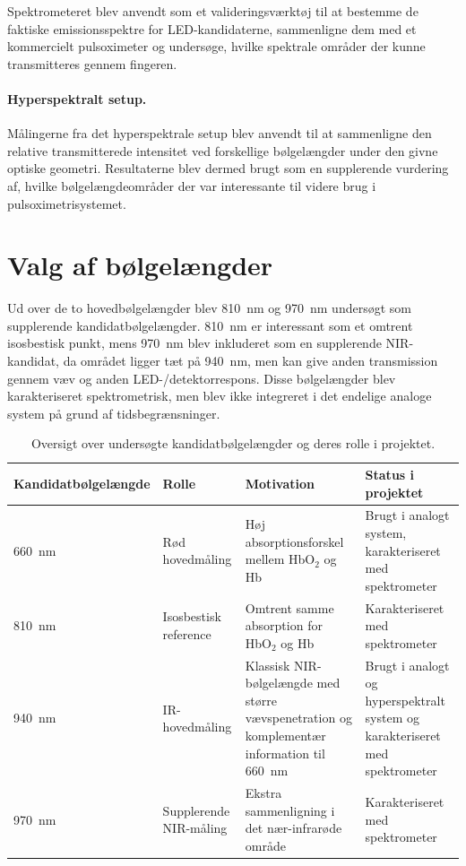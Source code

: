 Spektrometeret blev anvendt som et valideringsværktøj til at bestemme de faktiske emissionsspektre for LED-kandidaterne, sammenligne dem med et kommercielt pulsoximeter og undersøge, hvilke spektrale områder der kunne transmitteres gennem fingeren.

\paragraph{Hyperspektralt setup.}

Målingerne fra det hyperspektrale setup blev anvendt til at sammenligne den relative transmitterede intensitet ved forskellige bølgelængder under den givne optiske geometri. Resultaterne blev dermed brugt som en supplerende vurdering af, hvilke bølgelængdeområder der var interessante til videre brug i pulsoximetrisystemet.

\section{Valg af bølgelængder}
\label{sec:wavelength_selection}

Ud over de to hovedbølgelængder blev \SI{810}{nm} og \SI{970}{nm} undersøgt som supplerende kandidatbølgelængder. \SI{810}{nm} er interessant som et omtrent isosbestisk punkt, mens \SI{970}{nm} blev inkluderet som en supplerende NIR-kandidat, da området ligger tæt på \SI{940}{nm}, men kan give anden transmission gennem væv og anden LED-/detektorrespons. Disse bølgelængder blev karakteriseret spektrometrisk, men blev ikke integreret i det endelige analoge system på grund af tidsbegrænsninger.

\begin{table}[h]
\centering
\caption{Oversigt over undersøgte kandidatbølgelængder og deres rolle i projektet.}
\label{tab:kandidat_boelgelaengder}
\renewcommand{\arraystretch}{1.2}
\begin{tabularx}{\textwidth}{l l X X}
\toprule
Kandidatbølgelængde & Rolle & Motivation & Status i projektet \\
\midrule
\SI{660}{nm} & Rød hovedmåling & Høj absorptionsforskel mellem HbO$_2$ og Hb & Brugt i analogt system, karakteriseret med spektrometer \\
\SI{810}{nm} & Isosbestisk reference & Omtrent samme absorption for HbO$_2$ og Hb & Karakteriseret med spektrometer \\
\SI{940}{nm} & IR-hovedmåling & Klassisk NIR-bølgelængde med større vævspenetration og komplementær information til \SI{660}{nm} & Brugt i analogt og hyperspektralt system og karakteriseret med spektrometer  \\
\SI{970}{nm} & Supplerende NIR-måling & Ekstra sammenligning i det nær-infrarøde område & Karakteriseret med spektrometer \\
\bottomrule
\end{tabularx}
\end{table}


